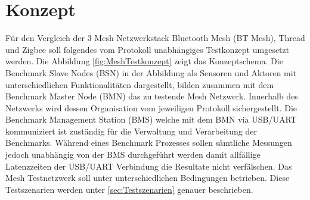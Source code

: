 	\clearpage
\section{Konzept}\label{sec:Konzept}

Für den Vergleich der 3 Mesh Netzwerkstack Bluetooth Mesh (BT Mesh), Thread und Zigbee soll folgendes vom Protokoll unabhängiges Testkonzept umgesetzt werden. 
Die Abbildung \ref{fig:MeshTestkonzept} zeigt das Konzeptschema. Die Benchmark Slave Nodes (BSN) in der Abbildung als Sensoren und Aktoren mit unterschiedlichen Funktionalitäten dargestellt, bilden zusammen mit dem Benchmark Master Node (BMN) das zu testende Mesh Netzwerk. Innerhalb des Netzwerks wird dessen Organisation vom jeweiligen Protokoll sichergestellt. 
Die Benchmark Management Station (BMS) welche mit dem BMN via USB/UART kommuniziert ist zuständig für die Verwaltung und Verarbeitung der Benchmarks. Während eines Benchmark Prozesses sollen sämtliche Messungen jedoch unabhängig von der BMS durchgeführt werden damit allfällige Latenzzeiten der USB/UART Verbindung die Resultate nicht verfälschen.
Das Mesh Testnetzwerk soll unter unterschiedlichen Bedingungen betrieben. Diese Testszenarien werden unter \ref{sec:Testszenarien} genauer beschrieben.













